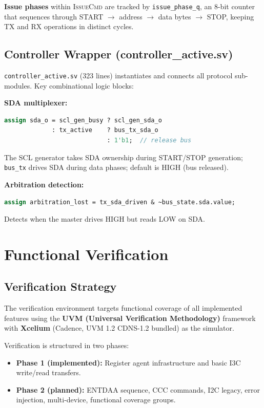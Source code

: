 \documentclass[12pt, a4paper, oneside]{report}
\newcommand{\signal}[1]{\texttt{#1}}
\newcommand{\file}[1]{\texttt{#1}}
\newcommand{\module}[1]{\texttt{#1}}
\newcommand{\state}[1]{\textsc{#1}}
\begin{document}
\textbf{Issue phases} within \state{IssueCmd} are tracked by \signal{issue\_phase\_q},
an 8-bit counter that sequences through START $\rightarrow$ address $\rightarrow$ data
bytes $\rightarrow$ STOP, keeping TX and RX operations in distinct cycles.

\section{Controller Wrapper (controller\_active.sv)}

\file{controller\_active.sv} (323 lines) instantiates and connects all protocol
sub-modules. Key combinational logic blocks:

\textbf{SDA multiplexer:}
\begin{lstlisting}[language=SystemVerilog, caption={SDA output multiplexer}]
assign sda_o = scl_gen_busy ? scl_gen_sda_o
             : tx_active    ? bus_tx_sda_o
                            : 1'b1;  // release bus
\end{lstlisting}

The SCL generator takes SDA ownership during START/STOP generation; \module{bus\_tx}
drives SDA during data phases; default is HIGH (bus released).

\textbf{Arbitration detection:}
\begin{lstlisting}[language=SystemVerilog, caption={Arbitration lost detection}]
assign arbitration_lost = tx_sda_driven & ~bus_state.sda.value;
\end{lstlisting}

Detects when the master drives HIGH but reads LOW on SDA.

\chapter{Functional Verification}

\section{Verification Strategy}

The verification environment targets functional coverage of all implemented features
using the \textbf{UVM (Universal Verification Methodology)} framework with
\textbf{Xcelium} (Cadence, UVM 1.2 CDNS-1.2 bundled) as the simulator.

Verification is structured in two phases:
\begin{itemize}
  \item \textbf{Phase 1 (implemented):} Register agent infrastructure and basic
        I3C write/read transfers.
  \item \textbf{Phase 2 (planned):} ENTDAA sequence, CCC commands, I2C legacy,
        error injection, multi-device, functional coverage groups.
\end{itemize}
\end{document}
